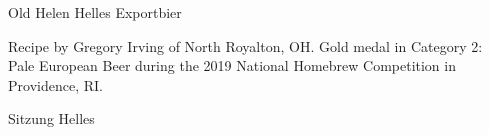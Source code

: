\begin{recipe}{Old Helen Helles Exportbier} %

\begin{aboutblock}
Recipe by Gregory Irving of North Royalton, OH. Gold medal in Category 2: Pale
European Beer during the 2019 National Homebrew Competition in Providence, RI.
\sourceaha
\end{aboutblock}


\begin{methodandtiming}
 
\begin{mashsteps}
\end{mashsteps}

\begin{fermentationsteps}
\end{fermentationsteps}

\end{methodandtiming}

\recipebreak

\begin{ingredientsblock}

\begin{malts}
\end{malts}

\begin{hops}
\end{hops}


\end{ingredientsblock}

\begin{recipe}{Sitzung Helles} %


\end{recipe}
\end{recipe}
